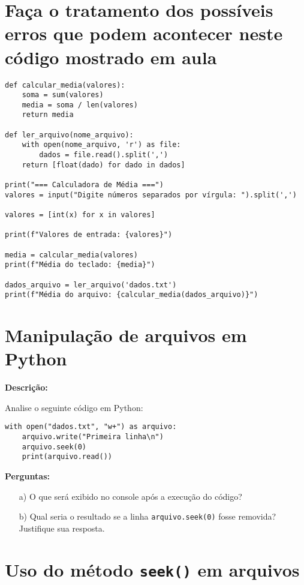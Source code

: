 \section{ Faça o tratamento dos possíveis erros que podem acontecer neste código mostrado em aula}

\begin{verbatim}
def calcular_media(valores):
    soma = sum(valores)
    media = soma / len(valores)
    return media

def ler_arquivo(nome_arquivo):
    with open(nome_arquivo, 'r') as file:
        dados = file.read().split(',')
    return [float(dado) for dado in dados]

print("=== Calculadora de Média ===")
valores = input("Digite números separados por vírgula: ").split(',')

valores = [int(x) for x in valores]

print(f"Valores de entrada: {valores}")

media = calcular_media(valores)
print(f"Média do teclado: {media}")

dados_arquivo = ler_arquivo('dados.txt')
print(f"Média do arquivo: {calcular_media(dados_arquivo)}")

\end{verbatim}

\section{Manipulação de arquivos em Python}

\textbf{Descrição:}  

Analise o seguinte código em Python:

\begin{verbatim}
with open("dados.txt", "w+") as arquivo:
    arquivo.write("Primeira linha\n")
    arquivo.seek(0)
    print(arquivo.read())
\end{verbatim}

\textbf{Perguntas:}

\begin{enumerate}
    \item[a)] O que será exibido no console após a execução do código?
    \item[b)] Qual seria o resultado se a linha \texttt{arquivo.seek(0)} fosse removida? Justifique sua resposta.
\end{enumerate}


\section{Uso do método \texttt{seek()} em arquivos}

